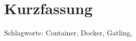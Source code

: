 \chapter*{Kurzfassung}
\thispagestyle{empty}

\bigskip



\noindent

\vspace*{\fill}
Schlagworte: 
Container, Docker, Gatling,
